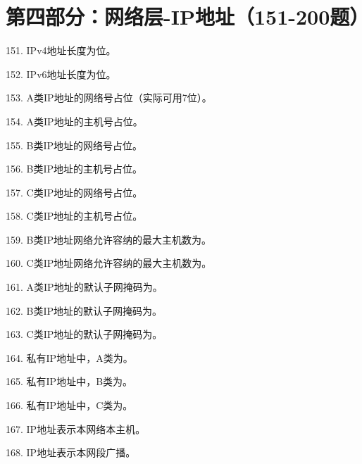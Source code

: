 \section{第四部分：网络层-IP地址（151-200题）}

151. IPv4地址长度为\underline{\hspace{2cm}}位。

152. IPv6地址长度为\underline{\hspace{2cm}}位。

153. A类IP地址的网络号占\underline{\hspace{2cm}}位（实际可用7位）。

154. A类IP地址的主机号占\underline{\hspace{2cm}}位。

155. B类IP地址的网络号占\underline{\hspace{2cm}}位。

156. B类IP地址的主机号占\underline{\hspace{2cm}}位。

157. C类IP地址的网络号占\underline{\hspace{2cm}}位。

158. C类IP地址的主机号占\underline{\hspace{2cm}}位。

159. B类IP地址网络允许容纳的最大主机数为\underline{\hspace{2cm}}。

160. C类IP地址网络允许容纳的最大主机数为\underline{\hspace{2cm}}。

161. A类IP地址的默认子网掩码为\underline{\hspace{2cm}}。

162. B类IP地址的默认子网掩码为\underline{\hspace{2cm}}。

163. C类IP地址的默认子网掩码为\underline{\hspace{2cm}}。

164. 私有IP地址中，A类为\underline{\hspace{2cm}}。

165. 私有IP地址中，B类为\underline{\hspace{2cm}}。

166. 私有IP地址中，C类为\underline{\hspace{2cm}}。

167. IP地址\underline{\hspace{2cm}}表示本网络本主机。

168. IP地址\underline{\hspace{2cm}}表示本网段广播。

